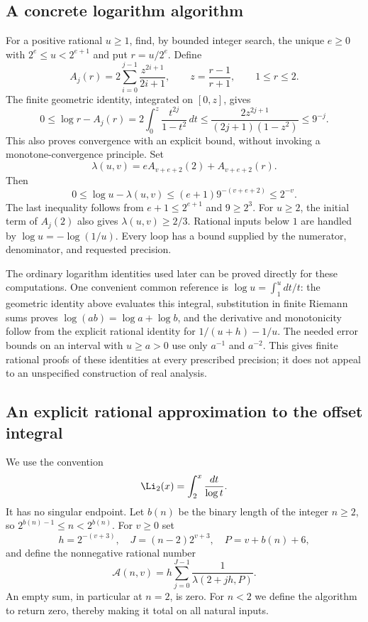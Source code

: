 \subsection{A concrete logarithm algorithm}

For a positive rational $u\ge1$, find, by bounded integer search, the unique
$e\ge0$ with $2^e\le u<2^{e+1}$ and put $r=u/2^e$. Define
\[
 A_j(r)=2\sum_{i=0}^{j-1}\frac{z^{2i+1}}{2i+1},
 \qquad z=\frac{r-1}{r+1},\qquad 1\le r\le2.
\]
The finite geometric identity, integrated on $[0,z]$, gives
\[
 0\le \log r-A_j(r)
 =2\int_0^z\frac{t^{2j}}{1-t^2}\,dt
 \le\frac{2z^{2j+1}}{(2j+1)(1-z^2)}\le9^{-j}.
\]
This also proves convergence with an explicit bound, without invoking a
monotone-convergence principle. Set
\begin{equation}\label{eq:log-algorithm}
 \lambda(u,v)=eA_{v+e+2}(2)+A_{v+e+2}(r).
\end{equation}
Then
\begin{equation}\label{eq:log-error}
 0\le\log u-\lambda(u,v)\le(e+1)9^{-(v+e+2)}\le2^{-v}.
\end{equation}
The last inequality follows from $e+1\le2^{e+1}$ and $9\ge 2^3$.
For $u\ge2$, the initial term of $A_j(2)$ also gives
$\lambda(u,v)\ge2/3$. Rational inputs below $1$ are handled by
$\log u=-\log(1/u)$. Every loop has a bound supplied by the numerator,
denominator, and requested precision.

The ordinary logarithm identities used later can be proved directly for
these computations. One convenient common reference is
$\log u=\int_1^u dt/t$: the geometric identity above evaluates this
integral, substitution in finite Riemann sums proves
$\log(ab)=\log a+\log b$, and the derivative and monotonicity follow from
the explicit rational identity for $1/(u+h)-1/u$. The needed error bounds
on an interval with $u\ge a>0$ use only $a^{-1}$ and $a^{-2}$.
This gives finite rational proofs of these identities at every prescribed
precision; it does not appeal to an unspecified construction of real analysis.

\subsection{An explicit rational approximation to the offset integral}

We use the convention
\[
 \Li_2(x)=\int_2^x\frac{dt}{\log t}.
\]
It has no singular endpoint. Let $b(n)$ be the binary length of the
integer $n\ge2$, so $2^{b(n)-1}\le n<2^{b(n)}$. For $v\ge0$ set
\[
 h=2^{-(v+3)},\quad J=(n-2)2^{v+3},\quad
 P=v+b(n)+6,
\]
and define the nonnegative rational number
\begin{equation}\label{eq:Li-algorithm}
 \mathcal A(n,v)=h\sum_{j=0}^{J-1}
       \frac1{\lambda(2+jh,P)}.
\end{equation}
An empty sum, in particular at $n=2$, is zero. For $n<2$ we define the
algorithm to return zero, thereby making it total on all natural inputs.


